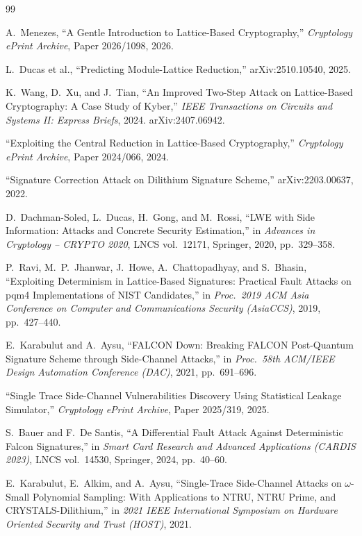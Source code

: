 \documentclass[11pt,a4paper]{article}
\begin{document}
\begin{thebibliography}{99}

A.~Menezes, ``A Gentle Introduction to Lattice-Based Cryptography,'' \emph{Cryptology ePrint Archive}, Paper 2026/1098, 2026.

L.~Ducas et al., ``Predicting Module-Lattice Reduction,'' arXiv:2510.10540, 2025.

K.~Wang, D.~Xu, and J.~Tian, ``An Improved Two-Step Attack on Lattice-Based Cryptography: A Case Study of Kyber,'' \emph{IEEE Transactions on Circuits and Systems II: Express Briefs}, 2024. arXiv:2407.06942.

``Exploiting the Central Reduction in Lattice-Based Cryptography,'' \emph{Cryptology ePrint Archive}, Paper 2024/066, 2024.

``Signature Correction Attack on Dilithium Signature Scheme,'' arXiv:2203.00637, 2022.

D.~Dachman-Soled, L.~Ducas, H.~Gong, and M.~Rossi, ``LWE with Side Information: Attacks and Concrete Security Estimation,'' in \emph{Advances in Cryptology -- CRYPTO 2020}, LNCS vol.~12171, Springer, 2020, pp.~329--358.

P.~Ravi, M.~P.~Jhanwar, J.~Howe, A.~Chattopadhyay, and S.~Bhasin, ``Exploiting Determinism in Lattice-Based Signatures: Practical Fault Attacks on pqm4 Implementations of NIST Candidates,'' in \emph{Proc.\ 2019 ACM Asia Conference on Computer and Communications Security (AsiaCCS)}, 2019, pp.~427--440.

E.~Karabulut and A.~Aysu, ``FALCON Down: Breaking FALCON Post-Quantum Signature Scheme through Side-Channel Attacks,'' in \emph{Proc.\ 58th ACM/IEEE Design Automation Conference (DAC)}, 2021, pp.~691--696.

``Single Trace Side-Channel Vulnerabilities Discovery Using Statistical Leakage Simulator,'' \emph{Cryptology ePrint Archive}, Paper 2025/319, 2025.

S.~Bauer and F.~De Santis, ``A Differential Fault Attack Against Deterministic Falcon Signatures,'' in \emph{Smart Card Research and Advanced Applications (CARDIS 2023)}, LNCS vol.~14530, Springer, 2024, pp.~40--60.

E.~Karabulut, E.~Alkim, and A.~Aysu, ``Single-Trace Side-Channel Attacks on $\omega$-Small Polynomial Sampling: With Applications to NTRU, NTRU Prime, and CRYSTALS-Dilithium,'' in \emph{2021 IEEE International Symposium on Hardware Oriented Security and Trust (HOST)}, 2021.


\end{thebibliography}
\end{document}

